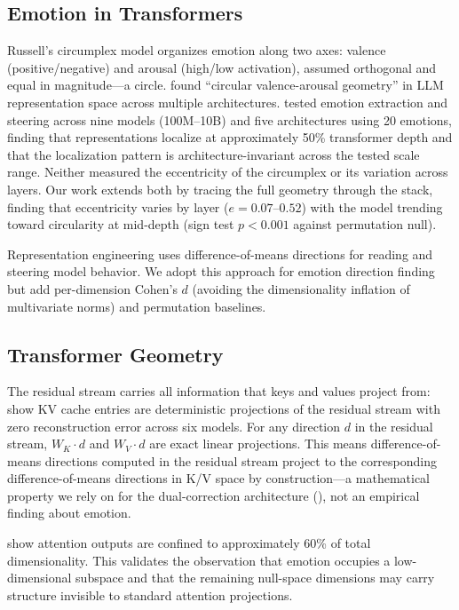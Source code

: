 \documentclass[11pt,a4paper]{article}
\begin{document}
\subsection{Emotion in Transformers}

Russell's circumplex model \citep{russell1980circumplex} organizes
emotion along two axes: valence (positive/negative) and arousal
(high/low activation), assumed orthogonal and equal in magnitude---a
circle. \citet{sun2026valence} found ``circular valence-arousal
geometry'' in LLM representation space across multiple architectures.
\citet{jeong2026emotion} tested emotion extraction and steering across
nine models (100M--10B) and five architectures using 20 emotions,
finding that representations localize at approximately 50\% transformer
depth and that the localization pattern is architecture-invariant across
the tested scale range. Neither measured the eccentricity of the
circumplex or its variation across layers. Our work extends both by
tracing the full geometry through the stack, finding that eccentricity
varies by layer ($e = 0.07\text{--}0.52$) with the model trending toward
circularity at mid-depth (sign test $p < 0.001$ against permutation
null).

Representation engineering \citep{zou2023representation} uses
difference-of-means directions for reading and steering model behavior.
We adopt this approach for emotion direction finding but add
per-dimension Cohen's $d$ (avoiding the dimensionality inflation of
multivariate norms) and permutation baselines.

\subsection{Transformer Geometry}

The residual stream carries all information that keys and values project
from: \citet{qasim2026residual} show KV cache entries are deterministic
projections of the residual stream with zero reconstruction error across
six models. For any direction $d$ in the residual stream, $W_K \cdot d$
and $W_V \cdot d$ are exact linear projections. This means
difference-of-means directions computed in the residual stream project to
the corresponding difference-of-means directions in K/V space by
construction---a mathematical property we rely on for the dual-correction
architecture (), not an empirical finding about emotion.

\citet{wang2025dimensional} show attention outputs are confined to
approximately 60\% of total dimensionality. This validates the
observation that emotion occupies a low-dimensional subspace and that the
remaining null-space dimensions may carry structure invisible to standard
attention projections.
\end{document}
